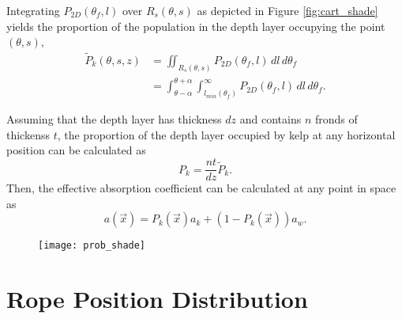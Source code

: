 Integrating $P_{2D}(\theta_f,l)$ over $R_s(\theta,s)$ as depicted in Figure \ref{fig:cart_shade} yields the proportion of the population in the depth layer occupying the point $(\theta,s)$,
\begin{align*}
		\tilde{P}_k(\theta,s,z)	&= \iint_{R_s(\theta,s)}
								P_{2D}(\theta_f,l)
								\,dl\,d\theta_f \nonumber \\
							&= \int_{\theta-\alpha}^{\theta+\alpha}
								\int_{l_{min}(\theta_f)}^\infty
								P_{2D}(\theta_f,l)
								\,dl\,d\theta_f.
\end{align*}

Assuming that the depth layer has thickness $dz$ and contains $n$ fronds of thickenss $t$,
the proportion of the depth layer occupied by kelp at any horizontal position can be calculated as
\begin{equation*}
  P_k = \frac{nt}{dz}\tilde{P}_k.
\end{equation*}
Then, the effective absorption coefficient can be calculated at any point in space as
\begin{equation*}
  a(\vec{x}) = P_k(\vec{x})a_k + (1-P_k(\vec{x}))a_w.
\end{equation*}

\begin{figure}[h]
	\centering
	\texttt{[image: prob\_shade]}
	\label{fig:prob_shade}
\end{figure}

\section{Rope Position Distribution}
